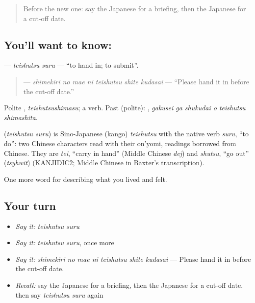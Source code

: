 \begin{quote}
Before the new one: say the Japanese for a briefing, then the Japanese for a cut-off date.
\end{quote}

\subsection*{You'll want to know: }
\textbf{} — \emph{teishutsu suru} — \textquotedblleft{}to hand in; to submit\textquotedblright{}.

\begin{quote}
\textbf{   } — \emph{shimekiri no mae ni teishutsu shite kudasai} — \textquotedblleft{}Please hand it in before the cut-off date.\textquotedblright{}
\end{quote}

Polite \textbf{}, \emph{teishutsushimasu}; a  verb. Past (polite): \textbf{  }, \emph{gakusei ga shukudai o teishutsu shimashita}.

\begin{cousinweb}
\textbf{} (\emph{teishutsu suru}) is Sino-Japanese (kango) \emph{teishutsu} with the native verb \emph{suru}, \textquotedblleft{}to do\textquotedblright{}: two Chinese characters read with their on'yomi, readings borrowed from Chinese. They are \emph{tei}, \textquotedblleft{}carry in hand\textquotedblright{} (Middle Chinese \emph{dej}) and \emph{shutsu}, \textquotedblleft{}go out\textquotedblright{} (\emph{tsyhwit}) (KANJIDIC2; Middle Chinese in Baxter's transcription).
\end{cousinweb}

\begin{grammarlens}[title={What you've built}]
One more word for describing what you lived and felt.
\end{grammarlens}

\subsection*{Your turn}
\begin{itemize}
\raggedright
  \item \emph{Say it:} \emph{teishutsu suru}
  \item \emph{Say it:} \emph{teishutsu suru}, once more
  \item \emph{Say it:} \emph{shimekiri no mae ni teishutsu shite kudasai} — Please hand it in before the cut-off date.
  \item \emph{Recall:} say the Japanese for a briefing, then the Japanese for a cut-off date, then say \emph{teishutsu suru} again
\end{itemize}

